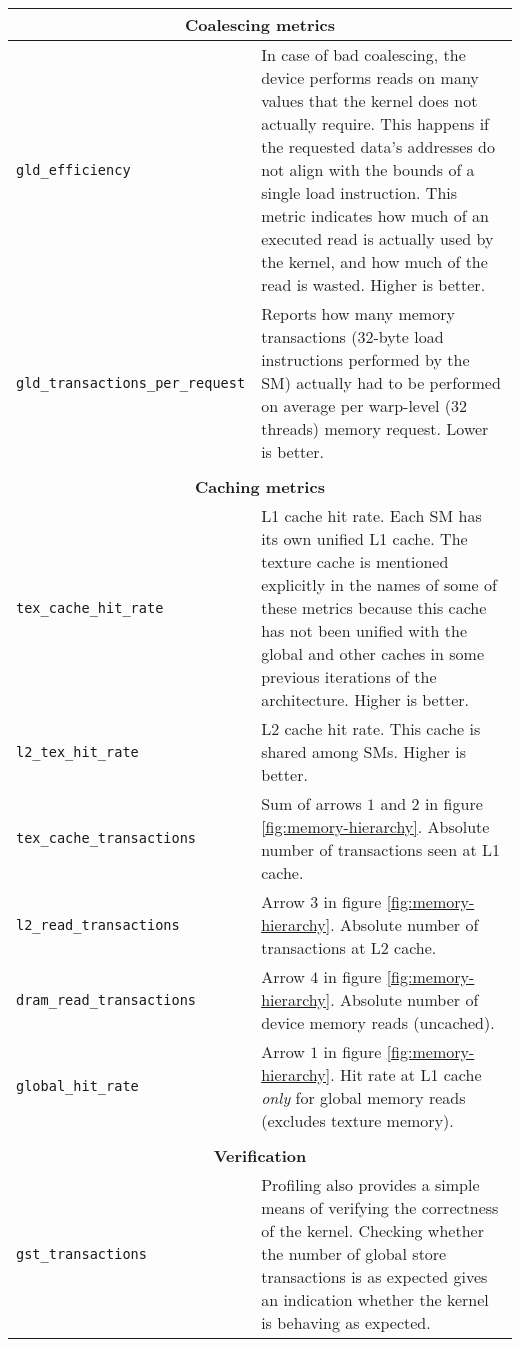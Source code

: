 \begin{longtable}{p{} p{}}
	\\
	\multicolumn{2}{c}{\textbf{Coalescing metrics}} \\
	\hline
	\hline
	\raggedright \texttt{gld\_\allowbreak efficiency} & In case of bad coalescing, the device performs reads on many values that the kernel does not actually require. This happens if the requested data's addresses do not align with the bounds of a single load instruction. This metric indicates how much of an executed read is actually used by the kernel, and how much of the read is wasted. Higher is better. \\
	\hline
	\raggedright \texttt{gld\_\allowbreak transactions\_\allowbreak per\_\allowbreak request} & Reports how many memory transactions (32-byte load instructions performed by the SM) actually had to be performed on average per warp-level (32 threads) memory request. Lower is better. \\
	
	\\
	\multicolumn{2}{c}{\textbf{Caching metrics}} \\
	\hline
	\hline
	
	\raggedright \texttt{tex\_\allowbreak cache\_\allowbreak hit\_\allowbreak rate} & L1 cache hit rate. Each SM has its own unified L1 cache. The texture cache is mentioned explicitly in the names of some of these metrics because this cache has not been unified with the global and other caches in some previous iterations of the architecture. Higher is better. \\
	\hline
	\raggedright \texttt{l2\_\allowbreak tex\_\allowbreak hit\_\allowbreak rate} & L2 cache hit rate. This cache is shared among SMs. Higher is better. \\
	\hline
	\raggedright \texttt{tex\_\allowbreak cache\_\allowbreak transactions} & Sum of arrows $1$ and $2$ in figure \ref{fig:memory-hierarchy}. Absolute number of transactions seen at L1 cache. \\
	\hline
	\raggedright \texttt{l2\_\allowbreak read\_\allowbreak transactions} & Arrow $3$ in figure \ref{fig:memory-hierarchy}. Absolute number of transactions at L2 cache. \\
	\hline
	\raggedright \texttt{dram\_\allowbreak read\_\allowbreak transactions} & Arrow $4$ in figure \ref{fig:memory-hierarchy}. Absolute number of device memory reads (uncached). \\
	\hline
	\raggedright \texttt{global\_\allowbreak hit\_\allowbreak rate} & Arrow $1$ in figure \ref{fig:memory-hierarchy}. Hit rate at L1 cache \emph{only} for global memory reads (excludes texture memory). \\
	
	\\
	\multicolumn{2}{c}{\textbf{Verification}} \\
	\hline
	\hline
	\raggedright \texttt{gst\_\allowbreak transactions} & Profiling also provides a simple means of verifying the correctness of the kernel. Checking whether the number of global store transactions is as expected gives an indication whether the kernel is behaving as expected. \\
	\hline
\end{longtable}

